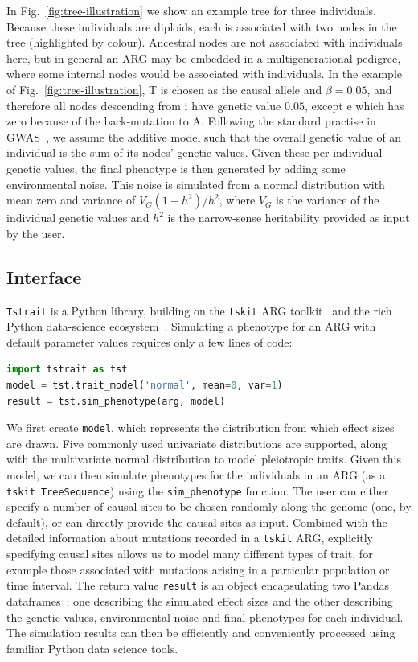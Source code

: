 \documentclass[unnumsec,webpdf,modern,large,namedate]{oup-authoring-template}%
\begin{document}
In Fig.~\ref{fig:tree-illustration} we show an example
tree for three individuals.
Because these individuals are diploids, each is associated
with two nodes in the tree (highlighted by colour).
Ancestral nodes are not associated with individuals here,
but in general an ARG may be embedded in a multigenerational
pedigree, where some internal nodes would be associated
with individuals.
In the example of
Fig.~\ref{fig:tree-illustration}, T is chosen as the causal
allele and $\beta=0.05$, and
therefore all nodes descending from \textsf{i}
have genetic value $0.05$, except \textsf{e} which
has zero because of the back-mutation to A.
Following the standard practise in GWAS~\citep{uffelmann2021},
we assume the additive model such that the overall
genetic value of an individual is the sum of its
nodes' genetic values.
Given these per-individual genetic values, the final phenotype
is then generated by adding some environmental noise.
This noise is simulated from a normal distribution with mean zero
and variance of $V_G(1-h^2)/{h^2}$,
where $V_G$ is the variance of the individual genetic values
and $h^2$ is the narrow-sense heritability provided as input by the user.

\subsection{Interface}
\texttt{Tstrait} is a Python library, building on the \texttt{tskit}
ARG toolkit~\citep{ralph2020,wong2023general} and the rich
Python data-science ecosystem~\citep{numpy}.
Simulating a phenotype for an ARG with default parameter
values requires only a few lines of code:
\begin{lstlisting}[language=Python,aboveskip=1em,belowskip=1em]
import tstrait as tst
model = tst.trait_model('normal', mean=0, var=1)
result = tst.sim_phenotype(arg, model)
\end{lstlisting}
We first create \texttt{model}, which represents the distribution
from which effect sizes are drawn. Five commonly used
univariate distributions are supported, along with the
multivariate normal distribution to model pleiotropic traits.
Given this model, we can then simulate phenotypes for the individuals
in an ARG (as a  \texttt{tskit TreeSequence}) using the
\texttt{sim\_phenotype} function.
The user can either specify a number of causal sites to be chosen randomly
along the genome (one, by default), or can directly provide the causal
sites as input. Combined with the detailed information about
mutations recorded in a \texttt{tskit} ARG, explicitly specifying causal
sites allows us to model many different types of trait, for example
those associated with mutations arising in a particular population
or time interval.
The return value \texttt{result} is an object encapsulating
two Pandas dataframes~\citep{mckinney2010data}: one describing the simulated
effect sizes and the other describing the genetic values,
environmental noise and final phenotypes for each individual.
The simulation results can then be efficiently and conveniently
processed using familiar Python data science tools.
\end{document}
